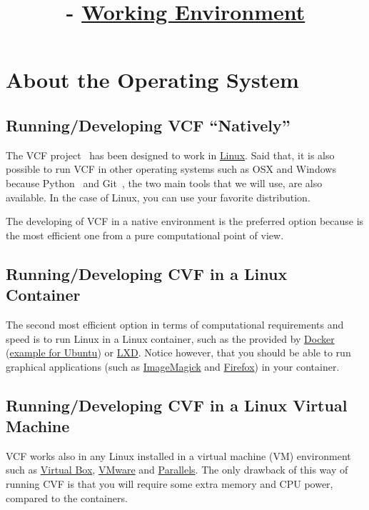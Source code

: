 

\title{\SM{} - \href{https://sistemas-multimedia.github.io/working_environment}{Working Environment}}

\maketitle

\tableofcontents

\section{About the Operating System}

\subsection{Running/Developing VCF ``Natively''}
The VCF project~\cite{vruiz__VCF} has been designed to work in
\href{https://en.wikipedia.org/wiki/Linux}{Linux}. Said that, it is
also possible to run VCF in other operating systems such as OSX and
Windows because Python~\cite{vruiz__YAPT} and
Git~\cite{vruiz__GitHub}, the two main tools that we will use, are
also available. In the case of Linux, you can use your favorite
distribution.

The developing of VCF in a native environment is the preferred option
because is the most efficient one from a pure computational point of
view.

\subsection{Running/Developing CVF in a Linux Container}
The second most efficient option in terms of computational
requirements and speed is to run Linux in a Linux container, such
as the provided by \href{https://hub.docker.com/}{Docker}
(\href{https://hub.docker.com/_/ubuntu}{example for Ubuntu})
or \href{https://linuxcontainers.org/}{LXD}. Notice however, that you
should be able to run graphical applications (such
as \href{https://linuxcontainers.org/}{ImageMagick}
and \href{https://www.mozilla.org/firefox}{Firefox}) in your
container.

\subsection{Running/Developing CVF in a Linux Virtual Machine}
VCF works also in any Linux installed in a virtual machine (VM)
environment such as \href{https://www.virtualbox.org/}{Virtual Box},
\href{https://www.vmware.com/}{VMware} and \href{https://www.vmware.com/}{Parallels}.
The only drawback of this way of running CVF is that you will require
some extra memory and CPU power, compared to the containers.

